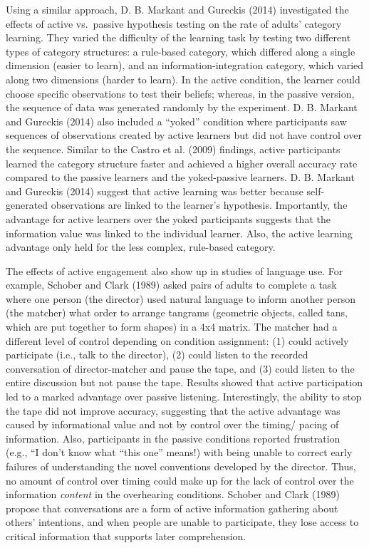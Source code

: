 \documentclass[english,floatsintext,man]{apa6}
\theoremstyle{definition}
\theoremstyle{definition}
\theoremstyle{definition}
\theoremstyle{remark}
\begin{document}
Using a similar approach, D. B. Markant and Gureckis (2014) investigated
the effects of active vs.~passive hypothesis testing on the rate of
adults' category learning. They varied the difficulty of the learning
task by testing two different types of category structures: a rule-based
category, which differed along a single dimension (easier to learn), and
an information-integration category, which varied along two dimensions
(harder to learn). In the active condition, the learner could choose
specific observations to test their beliefs; whereas, in the passive
version, the sequence of data was generated randomly by the experiment.
D. B. Markant and Gureckis (2014) also included a \enquote{yoked}
condition where participants saw sequences of observations created by
active learners but did not have control over the sequence. Similar to
the Castro et al. (2009) findings, active participants learned the
category structure faster and achieved a higher overall accuracy rate
compared to the passive learners and the yoked-passive learners. D. B.
Markant and Gureckis (2014) suggest that active learning was better
because self-generated observations are linked to the learner's
hypothesis. Importantly, the advantage for active learners over the
yoked participants suggests that the information value was linked to the
individual learner. Also, the active learning advantage only held for
the less complex, rule-based category.

The effects of active engagement also show up in studies of language
use. For example, Schober and Clark (1989) asked pairs of adults to
complete a task where one person (the director) used natural language to
inform another person (the matcher) what order to arrange tangrams
(geometric objects, called tans, which are put together to form shapes)
in a 4x4 matrix. The matcher had a different level of control depending
on condition assignment: (1) could actively participate (i.e., talk to
the director), (2) could listen to the recorded conversation of
director-matcher and pause the tape, and (3) could listen to the entire
discussion but not pause the tape. Results showed that active
participation led to a marked advantage over passive listening.
Interestingly, the ability to stop the tape did not improve accuracy,
suggesting that the active advantage was caused by informational value
and not by control over the timing/ pacing of information. Also,
participants in the passive conditions reported frustration (e.g., ``I
don't know what \enquote{this one} means!) with being unable to correct
early failures of understanding the novel conventions developed by the
director. Thus, no amount of control over timing could make up for the
lack of control over the information \emph{content} in the overhearing
conditions. Schober and Clark (1989) propose that conversations are a
form of active information gathering about others' intentions, and when
people are unable to participate, they lose access to critical
information that supports later comprehension.
\end{document}
